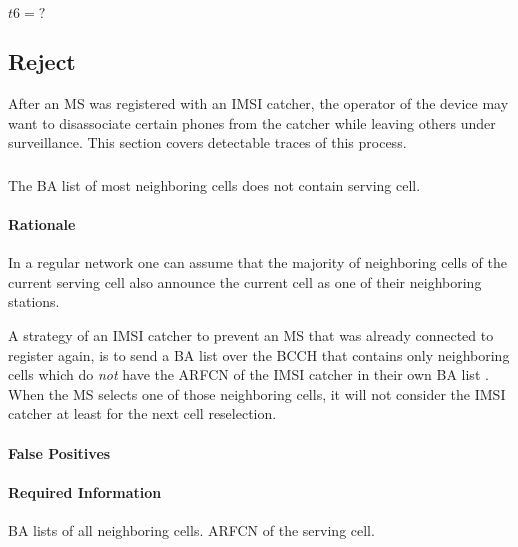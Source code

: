 \documentclass[a4paper,11pt,notitlepage,bigheadings,oneside]{scrartcl}
\begin{document}
$t6 = ?$

\subsection{Reject}

After an MS was registered with an IMSI catcher, the operator of the device may
want to disassociate certain phones from the catcher while leaving others under
surveillance. This section covers detectable traces of this process.

\subsubsection{}

The BA list of most neighboring cells does not contain serving cell.

\paragraph{Rationale}

In a regular network one can assume that the majority of neighboring cells of
the current serving cell also announce the current cell as one of their
neighboring stations. 

A strategy of an IMSI catcher to prevent an MS that was already connected to
register again, is to send a BA list over the BCCH that contains only
neighboring cells which do \emph{not} have the ARFCN of the IMSI catcher in
their own BA list \cite[0027]{bott2000verfahren}. When the MS selects one of
those neighboring cells, it will not consider the IMSI catcher at least for the
next cell reselection.

\paragraph{False Positives}


\paragraph{Required Information}

BA lists of all neighboring cells. ARFCN of the serving cell.

\end{document}
